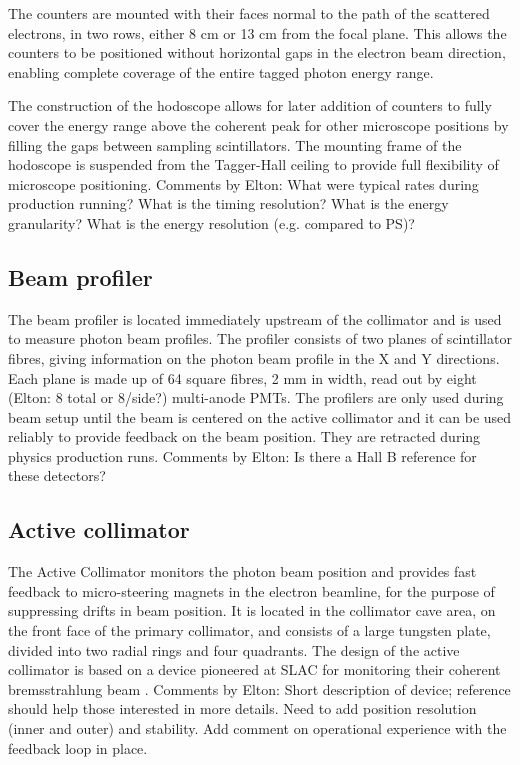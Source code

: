 The counters are mounted with their faces normal to the path of the scattered electrons, in two rows, either 8 cm or 13 cm from the focal plane.
This allows the counters to be positioned without horizontal gaps in the electron beam direction, enabling complete coverage of the entire tagged photon energy range.

The construction of the hodoscope allows for later addition of counters to fully cover the energy range above the coherent peak for other microscope positions by filling the gaps between sampling scintillators. The mounting frame of the hodoscope is suspended from the Tagger-Hall ceiling to provide full flexibility of microscope positioning.
{\color{red} Comments by Elton: What were typical rates during production running? What is the timing resolution? What is the energy granularity? What is the energy resolution (e.g. compared to PS)?}

\subsection{Beam profiler}
The beam profiler is located immediately upstream of the collimator and is used to measure photon beam profiles.
The profiler consists of two planes of scintillator fibres, giving information on the photon beam profile in the X and Y directions.
Each plane is made up of 64 square fibres, 2 mm in width, read out by eight {\color{red} (Elton: 8 total or 8/side?)} multi-anode PMTs. The profilers are only used during beam setup until
the beam is centered on the active collimator and it can be used reliably to provide feedback on the beam position. They are retracted during physics production runs.
{\color{red} Comments by Elton: Is there a Hall B reference for these detectors?}

\subsection{Active collimator \label{sec:coll}}
The Active Collimator monitors the photon beam position and provides fast feedback to micro-steering magnets in the electron beamline, for the purpose of suppressing drifts in beam position.
It is located in the collimator cave area, on the front face of the primary collimator, and consists of a large tungsten plate, divided into two radial rings and four quadrants. The design of the active collimator is based on a device pioneered at SLAC for monitoring their coherent bremsstrahlung beam \cite{Miller:1973yi}. 
{\color{red} Comments by Elton: Short description of device; reference should help those interested in more details. Need to add position resolution (inner and outer) and stability. Add comment on operational experience with the feedback loop in place.}


